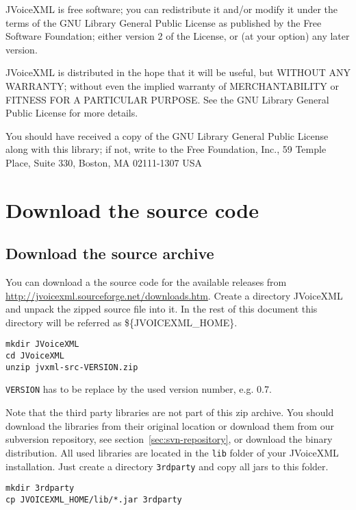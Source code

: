 \documentclass[11pt,a4paper]{article}
\begin{document}
JVoiceXML is free software; you can redistribute it and/or
modify it under the terms of the GNU Library General Public
License as published by the Free Software Foundation; either
version 2 of the License, or (at your option) any later version.

JVoiceXML is distributed in the hope that it will be useful,
but WITHOUT ANY WARRANTY; without even the implied warranty of
MERCHANTABILITY or FITNESS FOR A PARTICULAR PURPOSE. See the GNU
Library General Public License for more details.

You should have received a copy of the GNU Library General Public
License along with this library; if not, write to the Free
Foundation, Inc., 59 Temple Place, Suite 330, Boston, MA  02111-1307  USA

\section{Download the source code}

\subsection{Download the source archive}

You can download a the source code for the available releases from 
\url{http://jvoicexml.sourceforge.net/downloads.htm}.
Create a directory JVoice\-XML and unpack the zipped source file into it.
In the rest of this document this directory will be referred as
\$\{JVOICE\-XML\_HOME\}.

\begin{lstlisting}
mkdir JVoiceXML
cd JVoiceXML
unzip jvxml-src-VERSION.zip
\end{lstlisting}

\texttt{VERSION} has to be replace by the used version number, e.g. 0.7.

Note that the third party libraries are not part of this zip archive.
You should download the libraries from their original location or
download them from our subversion repository, see 
section~\ref{sec:svn-repository}, or download the binary distribution.
All used libraries are located in the \texttt{lib} folder of
your JVoiceXML installation. Just create a directory 
\texttt{3rdparty} and copy all jars to this folder.

\begin{lstlisting}
mkdir 3rdparty
cp JVOICEXML_HOME/lib/*.jar 3rdparty
\end{lstlisting}
\end{document}

